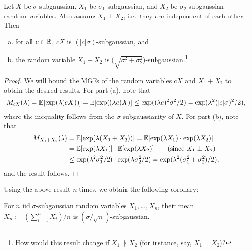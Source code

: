 \documentclass[twoside]{article}
\begin{document}
    \begin{proposition}
      Let $X$ be $\sigma$-subgaussian, $X_1$ be $\sigma_1$-subgaussian, and $X_2$ be $\sigma_2$-subgaussian random variables. Also assume $X_1 \perp X_2$, i.e.\ they are independent of each other. Then
      \begin{enumerate}[(a)]
      \item for all $c \in \mathbb{R}$, $cX$ is $(|c| \sigma)$-subgaussian, and
      \item the random variable $X_1 + X_2$ is $\big( \sqrt{\sigma_1^2 + \sigma_2^2} \big)$-subgaussian.\footnote{How would this result change if $X_1 \not \perp X_2$ (for instance, say, $X_1 = X_2$)?}
      \end{enumerate}
    \end{proposition}
    \begin{proof}
      We will bound the MGFs of the random variables $cX$ and $X_1 + X_2$ to obtain the desired results. For part (a), note that
      \begin{align*}
        M_{c X}(\lambda) = \mathbb{E}[ \exp(\lambda (cX)) ] = \mathbb{E}[ \exp((\lambda c) X) ] \leq \exp( (\lambda c)^2 \sigma^2 / 2) = \exp( \lambda^2 (|c| \sigma)^2 / 2),
      \end{align*}
      where the inequality follows from the $\sigma$-subgaussianity of $X$. For part (b), note that
      \begin{align*}
        M_{X_1 + X_2}(\lambda) &= \mathbb{E}[ \exp( \lambda (X_1 + X_2)) ] = \mathbb{E}[ \exp(\lambda X_1) \cdot \exp(\lambda X_2) ] \\
        &= \mathbb{E}[ \exp(\lambda X_1) ] \cdot \mathbb{E}[ \exp(\lambda X_2) ] \tag{since $X_1 \perp X_2$} \\
        &\leq \exp( \lambda^2 \sigma_1^2 / 2) \cdot \exp( \lambda \sigma_2^2 / 2) = \exp( \lambda^2 (\sigma_1^2 + \sigma_2^2) / 2),
      \end{align*}
      and the result follows.
    \end{proof}
    Using the above result $n$ times, we obtain the following corollary:
    \begin{corollary}
      For $n$ iid $\sigma$-subgaussian random variables $X_1, \ldots, X_n$, their mean $\bar X_n := (\sum_{i=1}^n X_i) / n$ is $(\sigma / \sqrt n)$-subgaussian.
    \end{corollary}
\end{document}
